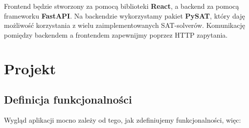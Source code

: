 \documentclass[a4paper,12pt,oneside]{book}
\theoremstyle{definition}
\begin{document}
Frontend będzie stworzony za pomocą biblioteki \textbf{React}, a backend za pomocą frameworku \textbf{FastAPI}. Na backendzie wykorzystamy pakiet \textbf{PySAT}, który daję możliwość korzystania z wielu zaimplementowanych SAT-solverów. Komunikację pomiędzy backendem a frontendem zapewnijmy poprzez HTTP zapytania.

\chapter{Projekt}

\section{Definicja funkcjonalności}

Wygląd aplikacji mocno zależy od tego, jak zdefiniujemy funkcjonalności, więc:  
\end{document}
